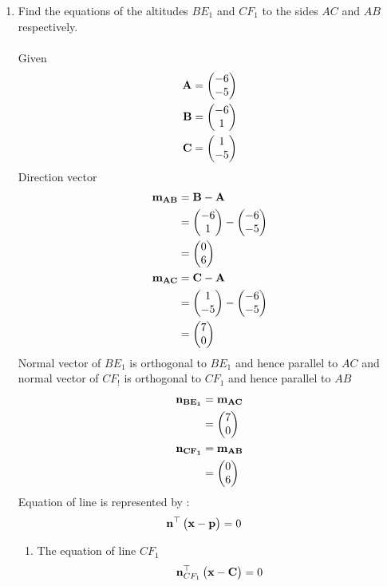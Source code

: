 \documentclass[11pt]{book}
\begin{document}
\begin{enumerate}[label=\thesection.\arabic*.,ref=\thesection.\theenumi]
\item Find the equations of the altitudes $BE_1$ and $CF_1$ to the sides $AC$ and $AB$ respectively. 
  \\    \\ \solution Given 
    \begin{align} 
 \mathbf{A} &= \begin{pmatrix} -6\\ -5 \end{pmatrix} \\ 
 \mathbf{B} &= \begin{pmatrix} -6\\ 1 \end{pmatrix}\\
 \mathbf{C} &= \begin{pmatrix} 1\\ -5\end{pmatrix}
 \end{align}
 Direction vector 
 \begin{align}
     \mathbf{m_{AB}}&=\mathbf{B}-\mathbf{A} \\
           &=\begin{pmatrix}-6 \\ 1\end{pmatrix} -\begin{pmatrix}-6 \\ -5\end{pmatrix}  \\
           &=\begin{pmatrix}0 \\ 6\end{pmatrix} \\
    \mathbf{ m_{AC}}&=\mathbf{C}-\mathbf{A} \\
     &=\begin{pmatrix}1 \\ -5\end{pmatrix} -\begin{pmatrix}-6 \\ -5\end{pmatrix}  \\
     &=\begin{pmatrix}7 \\ 0\end{pmatrix} \\
 \end{align}
  Normal vector of $BE_1$ is orthogonal to $BE_1$  and hence parallel to $AC$ and normal vector of $CF_!$ is orthogonal to $CF_1$ and hence parallel to $AB$
  \begin{align}
      \mathbf{n_{BE_1}}&=\mathbf{m_{AC}}\\
      &=\begin{pmatrix}7 \\ 0\end{pmatrix}\\
      \mathbf{n_{CF_1}}&=\mathbf{m_{AB}}\\
      &=\begin{pmatrix}0 \\ 6\end{pmatrix}\\
  \end{align}
  Equation of line is represented by :
  \begin{align}
      \mathbf{n}^{\top}\begin{pmatrix}\mathbf{x}-\mathbf{p}\end{pmatrix}&=0
  \end{align}
  \begin{enumerate}
      \item The equation of line $CF_1$
      \begin{align}
          \vec{n}^{\top}_{CF_1}\myvec{\vec{x}-\vec{C}}&=0 \\

\end{align}
\end{enumerate}
\end{enumerate}
\end{document}
